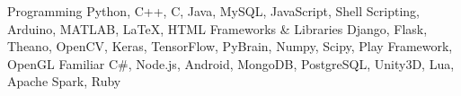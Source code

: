 \begin{cvskills}
  \cvskill
    {Programming}
    {Python, C++, C, Java, MySQL, JavaScript, Shell Scripting, Arduino, MATLAB, \LaTeX, HTML}
  \cvskill
    {Frameworks \& Libraries}
    {Django, Flask, Theano, OpenCV, Keras, TensorFlow, PyBrain, Numpy, Scipy, Play Framework, OpenGL}
  \cvskill
    {Familiar}
    {C\#, Node.js, Android, MongoDB, PostgreSQL, Unity3D, Lua, Apache Spark, Ruby}
\end{cvskills}